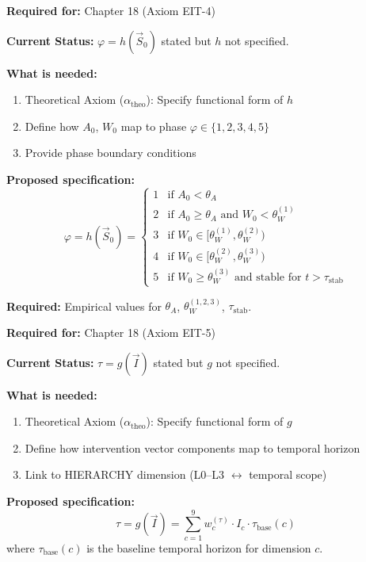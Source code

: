 \begin{tcolorbox}[colback=yellow!5!white, colframe=yellow!75!black,
    title=\textbf{TODO-IE-4: Journey Emergence Function $h(\vec{S}_0)$}]

\textbf{Required for:} Chapter 18 (Axiom EIT-4)

\textbf{Current Status:} $\varphi = h(\vec{S}_0)$ stated but $h$ not specified.

\textbf{What is needed:}
\begin{enumerate}[nosep]
    \item Theoretical Axiom ($\alpha_{\text{theo}}$): Specify functional form of $h$
    \item Define how $A_0$, $W_0$ map to phase $\varphi \in \{1,2,3,4,5\}$
    \item Provide phase boundary conditions
\end{enumerate}

\textbf{Proposed specification:}
\[
\varphi = h(\vec{S}_0) = \begin{cases}
1 & \text{if } A_0 < \theta_A \\
2 & \text{if } A_0 \geq \theta_A \text{ and } W_0 < \theta_W^{(1)} \\
3 & \text{if } W_0 \in [\theta_W^{(1)}, \theta_W^{(2)}) \\
4 & \text{if } W_0 \in [\theta_W^{(2)}, \theta_W^{(3)}) \\
5 & \text{if } W_0 \geq \theta_W^{(3)} \text{ and stable for } t > \tau_{\text{stab}}
\end{cases}
\]

\textbf{Required:} Empirical values for $\theta_A$, $\theta_W^{(1,2,3)}$, $\tau_{\text{stab}}$.

\end{tcolorbox}

\begin{tcolorbox}[colback=yellow!5!white, colframe=yellow!75!black,
    title=\textbf{TODO-IE-5: Effect-Horizon Function $g(\vec{I})$}]

\textbf{Required for:} Chapter 18 (Axiom EIT-5)

\textbf{Current Status:} $\tau = g(\vec{I})$ stated but $g$ not specified.

\textbf{What is needed:}
\begin{enumerate}[nosep]
    \item Theoretical Axiom ($\alpha_{\text{theo}}$): Specify functional form of $g$
    \item Define how intervention vector components map to temporal horizon
    \item Link to HIERARCHY dimension (L0--L3 $\leftrightarrow$ temporal scope)
\end{enumerate}

\textbf{Proposed specification:}
\[
\tau = g(\vec{I}) = \sum_{c=1}^{9} w_c^{(\tau)} \cdot I_c \cdot \tau_{\text{base}}(c)
\]
where $\tau_{\text{base}}(c)$ is the baseline temporal horizon for dimension $c$.

\end{tcolorbox}

